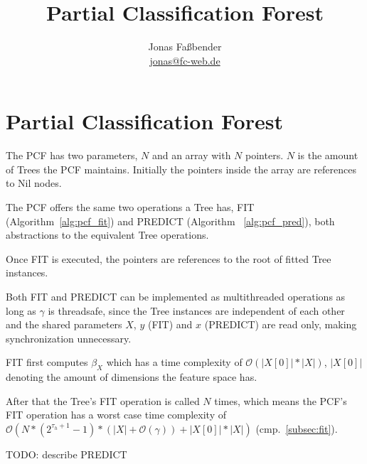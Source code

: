 \documentclass[journal]{IEEEtran}
\title{Partial Classification Forest}
\author{Jonas Fa{\ss}bender \\ [1ex]
  \href{mailto: jonas@fc-web.de}
  {jonas@fc-web.de}}
\date{}
\begin{document}

\maketitle

\begin{abstract}
\end{abstract}





\section{Partial Classification Forest}

The PCF has two parameters, $N$ and an array with $N$
pointers. $N$ is the amount of Trees the PCF maintains.
Initially the pointers inside the array are references to
Nil nodes.

The PCF offers the same two operations a Tree has, FIT
(Algorithm~\ref{alg:pcf_fit}) and PREDICT (Algorithm~%
\ref{alg:pcf_pred}), both abstractions to the equivalent
Tree operations.

Once FIT is executed, the pointers are references to the
root of fitted Tree instances.

Both FIT and PREDICT can be implemented as multithreaded
operations as long as $\gamma$ is threadsafe, since the
Tree instances are independent of each other and the shared
parameters $X$, $y$ (FIT) and $x$ (PREDICT) are read only,
making synchronization unnecessary.

FIT first computes $\beta_X$ which has a time complexity of
$\mathcal{O}(|X[0]| * |X|)$, $|X[0]|$ denoting the amount
of dimensions the feature space has.

After that the Tree's FIT operation is called $N$ times,
which means the PCF's FIT operation has a worst case time
complexity of $\mathcal{O} (N * (2^{\tau_h + 1} - 1) *
(|X| + \mathcal{O}(\gamma)) + |X[0]| * |X|)$
(cmp.~\ref{subsec:fit}).

TODO: describe PREDICT
\end{document}
